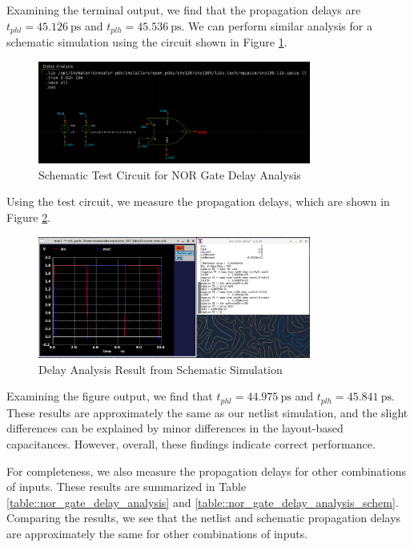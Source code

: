 \documentclass{article}
\begin{document}
	\noindent Examining the terminal output, we find that the propagation delays are $t_{phl} = 45.126\ \text{ps}$ and $t_{plh} = 45.536\ \text{ps}$. We can perform similar analysis for a schematic simulation using the circuit shown in Figure \ref{fig::nor_delay_analysis_test_circuit_schem}.
	
	\begin{figure}[H]
		\centerline{\includegraphics[width=0.8\textwidth]{nor_delay_analysis_test_circuit.png}}
		\caption{Schematic Test Circuit for NOR Gate Delay Analysis}
		\label{fig::nor_delay_analysis_test_circuit_schem}
	\end{figure}
	
	\noindent Using the test circuit, we measure the propagation delays, which are shown in Figure \ref{fig::nor_delay_analysis_schem}.
	
	\begin{figure}[H]
		\centerline{\includegraphics[width=0.8\textwidth]{nor_delay_analysis_schem.png}}
		\caption{Delay Analysis Result from Schematic Simulation}
		\label{fig::nor_delay_analysis_schem}
	\end{figure}
	
	\noindent Examining the figure output, we find that $t_{phl} = 44.975\ \text{ps}$ and $t_{plh} = 45.841\ \text{ps}$. These results are approximately the same as our netlist simulation, and the slight differences can be explained by minor differences in the layout-based capacitances. However, overall, these findings indicate correct performance.
	
	For completeness, we also measure the propagation delays for other combinations of inputs. These results are summarized in Table \ref{table::nor_gate_delay_analysis} and \ref{table::nor_gate_delay_analysis_schem}. Comparing the results, we see that the netlist and schematic propagation delays are approximately the same for other combinations of inputs.
	
\end{document}
